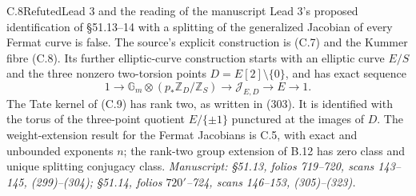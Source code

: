 \begin{statement}{C.8}{Refuted}{Lead 3 and the reading of the manuscript}
Lead 3's proposed identification of \S51.13--14 with a splitting
of the generalized Jacobian of every Fermat curve is false.
The source's explicit construction is (C.7) and the Kummer
fibre (C.8). Its further elliptic-curve construction starts
with an elliptic curve \(E/S\) and the three nonzero
two-torsion points \(D=E[2]\setminus\{0\}\), and has exact sequence
\[
 1\to \mathbb G_m\otimes
       (p_*\mathbb Z_D/\mathbb Z_S)
   \to\mathcal J_{E,D}\to E\to1.
                                                               \tag{C.9}
\]
The Tate kernel of (C.9) has rank two, as written in (303).
It is identified with the torus of the three-point quotient
\(E/\{\pm1\}\) punctured at the images of \(D\).
The weight-extension result for the Fermat Jacobians is C.5,
with exact and unbounded exponents \(n\); the rank-two group
extension of B.12 has zero class and unique splitting conjugacy
class.
\emph{Manuscript: \S51.13, folios 719--720, scans 143--145,
(299)--(304); \S51.14, folios \(720'\)--724, scans 146--153,
(305)--(323).}
\end{statement}
